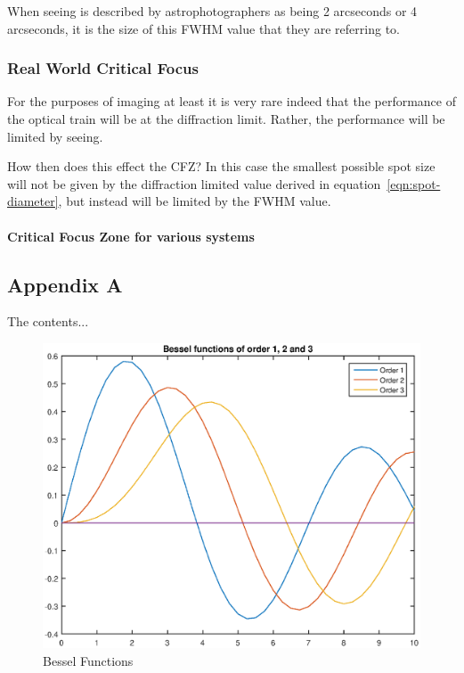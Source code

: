 \documentclass[11pt]{article}
\begin{document}
When seeing is described by astrophotographers as being 2 arcseconds or 4 arcseconds, it is the size of this FWHM value that they are referring to.
 
\subsection{Real World Critical Focus}

For the purposes of imaging at least it is very rare indeed that the performance of the optical train will be at the diffraction limit.  Rather, the performance will be limited by seeing.

How then does this effect the CFZ?  In this case the smallest possible spot size will not be given by the diffraction limited value derived in equation~\ref{eqn:spot-diameter}, but instead will be limited by the FWHM value.

\subsubsection{Critical Focus Zone for various systems}

\newpage
\begin{appendices}
	\chapter{Appendix A}
	
	The contents...
	
	\begin{figure}[htb]
		\begin{center}
			\includegraphics[scale=1.0]{bessel-funcs.eps}
			\caption{Bessel Functions}
			\label{fig:bessel-funcs}
		\end{center}
	\end{figure}
\end{appendices}
\end{document}
